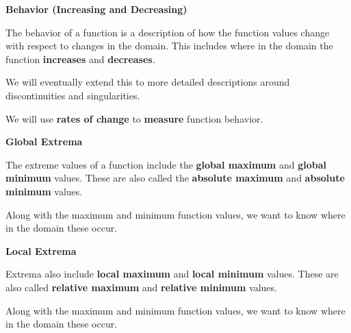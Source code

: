 \documentclass{ximera}
\begin{document}
\begin{explanation}  \textbf{\textcolor{red!75!green}{Behavior (Increasing and Decreasing)}} 

The behavior of a function is a description of how the function values change with respect to changes in the domain.  This includes where in the domain the function \textbf{\textcolor{purple!85!blue}{increases}} and \textbf{\textcolor{purple!85!blue}{decreases}}. 


We will eventually extend this to more detailed descriptions around discontinuities and singularities.


We will use \textbf{rates of change} to \textbf{measure} function behavior.

\end{explanation}









\begin{explanation}  \textbf{\textcolor{red!75!green}{Global Extrema}} 

The extreme values of a function include the \textbf{\textcolor{purple!85!blue}{global maximum}} and \textbf{\textcolor{purple!85!blue}{global minimum}} values. These are also called the \textbf{\textcolor{purple!85!blue}{absolute maximum}} and \textbf{\textcolor{purple!85!blue}{absolute minimum}} values.  



Along with the maximum and minimum function values, we want to know where in the domain these occur.


\end{explanation}










\begin{explanation}  \textbf{\textcolor{red!75!green}{Local Extrema}} 

Extrema also include \textbf{\textcolor{purple!85!blue}{local maximum}} and \textbf{\textcolor{purple!85!blue}{local minimum}} values. These are also called \textbf{\textcolor{purple!85!blue}{relative maximum}} and \textbf{\textcolor{purple!85!blue}{relative minimum}} values.  


Along with the maximum and minimum function values, we want to know where in the domain these occur.


\end{explanation}
\end{document}
